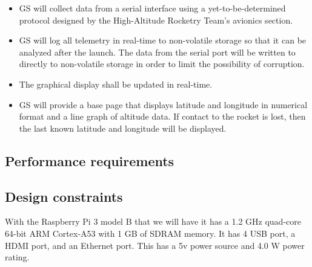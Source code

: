 \documentclass[10pt,draftclsnofoot,onecolumn]{IEEEtran}
\begin{document}
	\begin{itemize}
		\item GS will collect data from a serial interface using a yet-to-be-determined protocol designed by the High-Altitude Rocketry Team's avionics section.
		\item GS will log all telemetry in real-time to non-volatile storage so that it can be analyzed
		after the launch.
		The data from the serial port will be written to directly to non-volatile storage in order to limit
		the possibility of corruption.
		\item The graphical display shall be updated in real-time.
		\item GS will provide a base page that displays latitude and longitude in numerical format and
		a line graph of altitude data.
		If contact to the rocket is lost, then the last known latitude and longitude will be displayed.	


	\end{itemize}
	
	\subsection{Performance requirements}
	\subsection{Design constraints}
	With the Raspberry Pi 3 model B that we will have it has a 1.2 GHz quad-core 64-bit ARM Cortex-A53 
	with 1 GB of SDRAM memory.  It has 4 USB port, a HDMI port, and an Ethernet port.  This has a 5v 
	power source and 4.0 W power rating.
\end{document}
